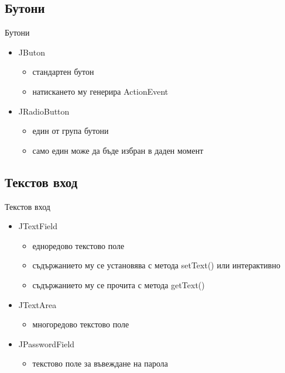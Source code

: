 \documentclass{beamer}
\begin{document}
\subsection{Бутони}
\begin{frame}{Бутони}
  \transdissolve
  \begin{itemize}
  \item JButon
    \begin{itemize}
      \item стандартен бутон
      \item натискането му генерира ActionEvent
    \end{itemize}
  \item JRadioButton
    \begin{itemize}
      \item един от група бутони
      \item само един може да бъде избран в даден момент
    \end{itemize}
  \end{itemize}
\end{frame}

\subsection{Текстов вход}
\begin{frame}{Текстов вход}
  \transdissolve
  \begin{itemize}
  \item JTextField
    \begin{itemize}
      \item едноредово текстово поле
      \item съдържанието му се установява с метода setText() или
        интерактивно
      \item съдържанието му се прочита с метода getText()
    \end{itemize}
  \item JTextArea
    \begin{itemize}
      \item многоредово текстово поле
    \end{itemize}
  \item JPasswordField
    \begin{itemize}
      \item текстово поле за въвеждане на парола
    \end{itemize}

  \end{itemize}
\end{frame}
\end{document}
